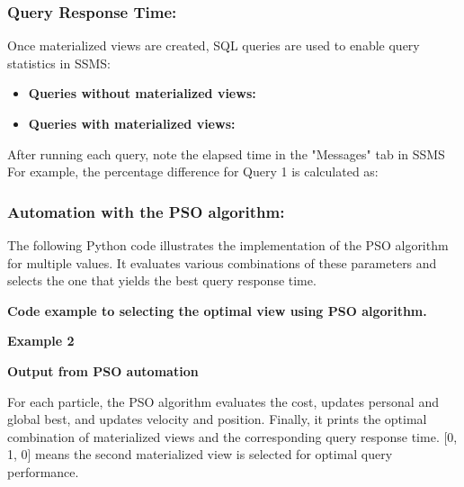   
  
  
\subsubsection{Query Response Time:} Once materialized views are created, SQL queries are used to enable query statistics in SSMS:

   

\begin{itemize}
    \item \textbf{Queries without materialized views:}
    \item \textbf{Queries with materialized views:}
\end{itemize}

After running each query, note the elapsed time in the "Messages" tab in SSMS
For example, the percentage difference for Query 1 is calculated as:



\begin{comment}\[
\text{Difference (\%)} = \frac{\text{Without MV} - \text{With MV}}{\text{Without MV}} \times 100 = \frac{2.35 - 0.45}{2.35} \times 100 \approx 80.85\%
\]
\end{comment}


\subsubsection{Automation with the PSO algorithm:}
 The following Python code illustrates the implementation of the PSO algorithm for multiple values. It evaluates various combinations of these parameters and selects the one that yields the best query response time.\vspace{.4cm}
 


\textbf{Code example to selecting the optimal view using PSO algorithm.}

  \vspace{.4cm}

\textbf{Example 2}
  \vspace{.4cm}

  \textbf{Output from PSO automation } 

  
  


 For each particle, the PSO algorithm evaluates the cost, updates personal and global best, and updates velocity and position. Finally, it prints the optimal combination of materialized views and the corresponding query response time.
 [0, 1, 0] means the second materialized view is selected for optimal query performance.
  


